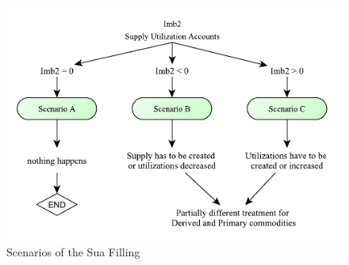 \documentclass[]{article}
\begin{document}
\begin{figure}[h]

{\centering \includegraphics[width=0.8\linewidth]{images/StandBal/05b_ScenariosFilling} 

}

\caption{\label{fig:f5}Scenarios of the Sua Filling}\label{fig:f5}
\end{figure}
\end{document}
